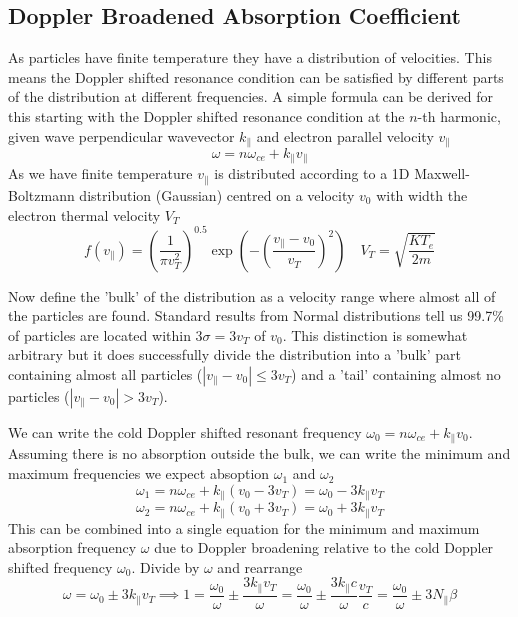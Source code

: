 \subsection{Doppler Broadened Absorption Coefficient}
As particles have finite temperature they have a distribution of velocities. This means the Doppler shifted resonance condition can be satisfied by different parts of the distribution at different frequencies. A simple formula can be derived for this starting with the Doppler shifted resonance condition at the $n$-th harmonic, given wave perpendicular wavevector $k_{\parallel}$ and electron parallel velocity $v_{\parallel}$
\begin{equation}
	\omega = n \omega_{ce} + k_{\parallel} v_{\parallel}
\end{equation}
As we have finite temperature $v_{\parallel}$ is distributed according to a 1D Maxwell-Boltzmann distribution (Gaussian) centred on a velocity $v_0$ with width the electron thermal velocity $V_T$
\begin{equation}
	f \left(v_{\parallel} \right) = \left( \frac{1}{\pi v_T^2} \right)^{0.5} \exp \left( - \left( \frac{v_{\parallel} - v_0}{v_T} \right)^2 \right) \quad V_T = \sqrt{\frac{KT_e}{2m}}
\end{equation}

Now define the 'bulk' of the distribution as a velocity range where almost all of the particles are found. Standard results from Normal distributions tell us 99.7\% of particles are located within $3 \sigma = 3v_T$ of $v_0$. This distinction is somewhat arbitrary but it does successfully divide the distribution into a 'bulk' part containing almost all particles ($|v_{\parallel} - v_0| \le 3v_T$) and a 'tail' containing almost no particles ($|v_{\parallel} - v_0| > 3v_T$).

We can write the cold Doppler shifted resonant frequency $\omega_0 = n \omega_{ce} + k_{\parallel}v_0$. Assuming there is no absorption outside the bulk, we can write the minimum and maximum frequencies we expect absoption $\omega_1$ and $\omega_2$
\begin{equation}
	\omega_1=n \omega_{ce} + k_{\parallel} \left( v_0 - 3v_T\right) = \omega_0 - 3 k_{\parallel}v_T
\end{equation}
\begin{equation}
	\omega_2=n \omega_{ce} + k_{\parallel} \left( v_0 + 3v_T \right) = \omega_0 + 3 k_{\parallel}v_T
\end{equation}
This can be combined into a single equation for the minimum and maximum absorption frequency $\omega$ due to Doppler broadening relative to the cold Doppler shifted frequency $\omega_0$. Divide by $\omega$ and rearrange
\begin{equation}
	\omega = \omega_0 \pm 3 k_{\parallel}v_T \implies 1 = \frac{\omega_0}{\omega} \pm \frac{3 k_{\parallel}v_T}{\omega} = \frac{\omega_0}{\omega} \pm \frac{3 k_{\parallel}c}{\omega} \frac{v_T}{c} =  \frac{\omega_0}{\omega} \pm 3N_{\parallel}\beta
\end{equation}

